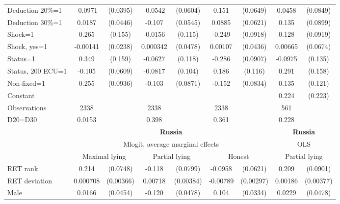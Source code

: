 \begin{tabular}{l|cccccc|cc}
Deduction 20\%=1&  -0.0971\sym{**} & (0.0395)&  -0.0542         & (0.0604)&    0.151\sym{**} & (0.0649)&   0.0458         & (0.0849)\\
Deduction 30\%=1&   0.0187         & (0.0446)&   -0.107\sym{**} & (0.0545)&   0.0885         & (0.0621)&    0.135         & (0.0899)\\
Shock=1         &    0.265\sym{*}  &  (0.155)&  -0.0156         &  (0.115)&   -0.249\sym{***}& (0.0918)&    0.128         & (0.0919)\\
Shock, yes=1    & -0.00141         & (0.0238)& 0.000342         & (0.0478)&  0.00107         & (0.0436)&  0.00665         & (0.0674)\\
Status=1        &    0.349\sym{**} &  (0.159)&  -0.0627         &  (0.118)&   -0.286\sym{***}& (0.0907)&  -0.0975         &  (0.135)\\
Status, 200 ECU=1&   -0.105\sym{*}  & (0.0609)&  -0.0817         &  (0.104)&    0.186         &  (0.116)&    0.291\sym{*}  &  (0.158)\\
Non-fixed=1     &    0.255\sym{***}& (0.0936)&   -0.103         & (0.0871)&   -0.152\sym{*}  & (0.0834)&    0.135         &  (0.121)\\
Constant        &                  &         &                  &         &                  &         &    0.224         &  (0.223)\\
\hline
Observations    &     2338         &         &     2338         &         &     2338         &         &      561         &         \\
D20=D30         &   0.0153         &         &    0.398         &         &    0.361         &         &    0.228         &         \\
\hline\hline
&\multicolumn{6}{c|}{\bf Russia}&\multicolumn{2}{c}{\bf Russia}\\ &\multicolumn{6}{c|}{Mlogit, average marginal effects }&\multicolumn{2}{c}{OLS}\\
                &\multicolumn{2}{c}{Maximal lying}&\multicolumn{2}{c}{Partial lying}&\multicolumn{2}{c}{Honest}  &\multicolumn{2}{c}{Partial lying}\\
\hline
RET rank        &    0.214\sym{***}& (0.0748)&   -0.118         & (0.0799)&  -0.0958         & (0.0621)&    0.209\sym{**} & (0.0901)\\
RET deviation   & 0.000708         &(0.00366)&  0.00718\sym{*}  &(0.00384)& -0.00789\sym{***}&(0.00297)&  0.00186         &(0.00377)\\
Male            &   0.0166         & (0.0454)&   -0.120\sym{**} & (0.0478)&    0.104\sym{***}& (0.0334)&   0.0229         & (0.0478)\\

\end{tabular}
